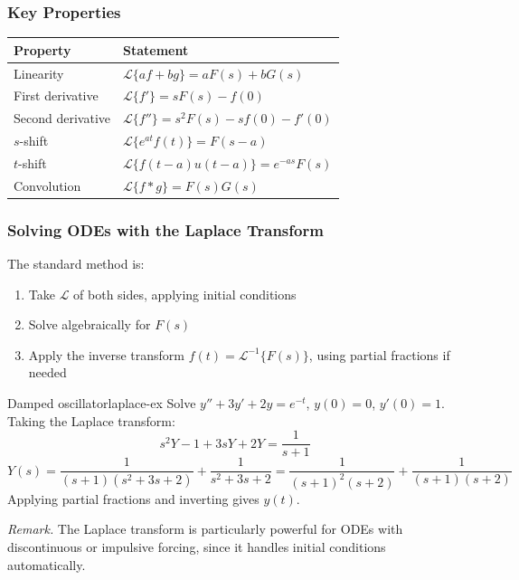 \documentclass[11pt, letterpaper]{article}
\theoremstyle{plain}
\newenvironment{remark}{\smallskip\noindent\textit{Remark.}}{\smallskip}
\begin{document}
\subsubsection*{Key Properties}

\begin{center}
\begin{tabular}{ll}
    \toprule
    Property & Statement \\
    \midrule
    Linearity       & $\mathcal{L}\{af + bg\} = aF(s) + bG(s)$ \\[4pt]
    First derivative & $\mathcal{L}\{f'\} = sF(s) - f(0)$ \\[4pt]
    Second derivative & $\mathcal{L}\{f''\} = s^2F(s) - sf(0) - f'(0)$ \\[4pt]
    $s$-shift        & $\mathcal{L}\{e^{at}f(t)\} = F(s-a)$ \\[4pt]
    $t$-shift        & $\mathcal{L}\{f(t-a)u(t-a)\} = e^{-as}F(s)$ \\[4pt]
    Convolution      & $\mathcal{L}\{f*g\} = F(s)G(s)$ \\
    \bottomrule
\end{tabular}
\end{center}

\subsubsection*{Solving ODEs with the Laplace Transform}

The standard method is:
\begin{enumerate}[(1)]
    \item Take $\mathcal{L}$ of both sides, applying initial conditions
    \item Solve algebraically for $F(s)$
    \item Apply the inverse transform $f(t) = \mathcal{L}^{-1}\{F(s)\}$,
          using partial fractions if needed
\end{enumerate}

\begin{example}{Damped oscillator}{laplace-ex}
    Solve $y'' + 3y' + 2y = e^{-t}$, $y(0) = 0$, $y'(0) = 1$.
    Taking the Laplace transform:
    \[
        s^2Y - 1 + 3sY + 2Y = \frac{1}{s+1}
    \]
    \[
        Y(s) = \frac{1}{(s+1)(s^2+3s+2)} + \frac{1}{s^2+3s+2}
             = \frac{1}{(s+1)^2(s+2)} + \frac{1}{(s+1)(s+2)}
    \]
    Applying partial fractions and inverting gives $y(t)$.
\end{example}

\begin{remark}
    The Laplace transform is particularly powerful for ODEs with
    discontinuous or impulsive forcing, since it handles initial conditions
    automatically.
\end{remark}
\end{document}
